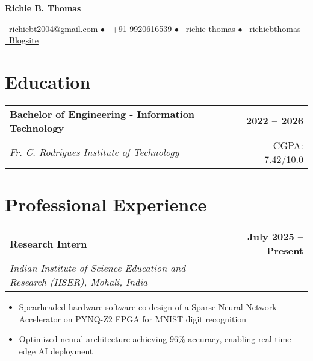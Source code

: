 \documentclass[10pt,a4paper]{article}
\makeatletter
\newcommand{\resumeItem}[1]{\item\small{#1}}
\newcommand{\resumeSubheading}[4]{
  \vspace{-1pt}
  \begin{tabular*}{\textwidth}[t]{l@{\extracolsep{\fill}}r}
    \textbf{#1} & \textcolor{light}{\small\textbf{#2}} \\
    \textit{\small#3} & \textcolor{light}{\small#4} \\
  \end{tabular*}\vspace{-5pt}
}
\makeatother
\begin{document}
\begin{center}
    {\LARGE\bfseries\color{primary} Richie B. Thomas}
    
    \vspace{0.3em}
    
    \href{mailto:richiebt2004@gmail.com}{\faEnvelope\ richiebt2004@gmail.com} $\bullet$
    \href{tel:+919920616539}{\faMobile\ +91-9920616539} $\bullet$
    \href{https://www.linkedin.com/in/richie-thomas/}{\faLinkedin\ richie-thomas} $\bullet$
    \href{https://github.com/richiebthomas}{\faGithub\ richiebthomas}
    \href{https://richiebthomas.github.io/blog}{\faGlobe\ Blogsite}
\end{center}

\vspace{0.2em}

\section{Education}

\resumeSubheading
{Bachelor of Engineering - Information Technology}{2022 -- 2026}
{Fr. C. Rodrigues Institute of Technology}{CGPA: 7.42/10.0}

\vspace{0.1em}

\section{Professional Experience}

\resumeSubheading
{Research Intern}{July 2025 -- Present}
{Indian Institute of Science Education and Research (IISER), Mohali, India}{}
\begin{itemize}
    \resumeItem{Spearheaded hardware-software co-design of a Sparse Neural Network Accelerator on PYNQ-Z2 FPGA for MNIST digit recognition}
    \resumeItem{Optimized neural architecture achieving 96\% accuracy, enabling real-time edge AI deployment}
\end{itemize}
\end{document}
